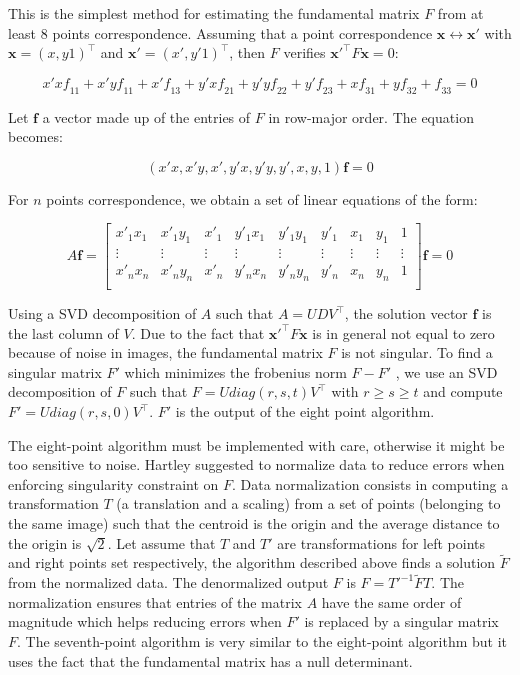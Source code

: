 \documentclass[12pt]{article}
\begin{document}
This is the simplest method for estimating the fundamental matrix $F$ from at least 8 points correspondence. Assuming that a point correspondence $\mathbf{x} \leftrightarrow \mathbf{x}'$ with $\mathbf{x} = (x, y 1)^\top$ and $\mathbf{x}' = (x', y' 1)^\top$, then $F$ verifies $\mathbf{x}'^\top F\mathbf{x} = 0$:

\[
    x'x\mathit{f}_{11} + x'y\mathit{f}_{11} + x'\mathit{f}_{13} + y'x\mathit{f}_{21} + y'y\mathit{f}_{22} + y'\mathit{f}_{23} + x\mathit{f}_{31} + y\mathit{f}_{32} + \mathit{f}_{33} = 0
\]

Let $\mathbf{f}$ a vector made up of the entries of $F$ in row-major order. The equation becomes:

\[
(x'x, x'y, x', y'x, y'y, y', x, y, 1)\mathbf{f} = 0
\]

For $n$ points correspondence, we obtain a set of linear equations of the form:

\[
    A\mathbf{f} = 
\left [
  \begin{array}{ccccccccc}
    x'_1x_1 & x'_1y_1 & x'_1 & y'_1x_1 & y'_1y_1 & y'_1 & x_1 & y_1 & 1 \\
    \vdots & \vdots & \vdots & \vdots & \vdots & \vdots & \vdots & \vdots & \vdots \\
    x'_nx_n & x'_ny_n & x'_n & y'_nx_n & y'_ny_n & y'_n & x_n & y_n & 1 \\
  \end{array}
\right ] 
\mathbf{f} = 0
\]

Using a SVD decomposition of $A$ such that $A = UDV^\top$, the solution vector $\mathbf{f}$ is the last column of $V$.
Due to the fact that $\mathbf{x}'^\top F\mathbf{x}$ is in general not equal to zero because of noise in images, the fundamental matrix $F$ is not singular. To find a singular matrix $F'$ which minimizes the frobenius norm $F - F'$ , we use an SVD decomposition of $F$ such that $F = Udiag(r, s, t)V^\top$ with $r \geq s \geq t$ and compute $F' = Udiag(r, s, 0)V^\top$. $F'$ is the output of the eight point algorithm.

The eight-point algorithm must be implemented with care, otherwise it might be too sensitive to noise. Hartley suggested to normalize data\cite{DefenceEightPoint} to reduce errors when enforcing singularity constraint on $F$. Data normalization consists in computing a transformation $T$ (a translation and a scaling) from a set of points (belonging to the same image) such that the centroid is the origin and the average distance to the origin is $\sqrt{2}$. Let assume that $T$ and $T'$ are transformations for left points and right points set respectively, the algorithm described above finds a solution $\widetilde{F}$ from the normalized data. The denormalized output $F$ is $F = T'^{-1}\widetilde{F}T$. The normalization ensures that entries of the matrix $A$ have the same order of magnitude which helps reducing errors when $F'$ is replaced by a singular matrix $F$.
The seventh-point algorithm is very similar to the eight-point algorithm but it uses the fact that the fundamental matrix has a null determinant.
\end{document}
